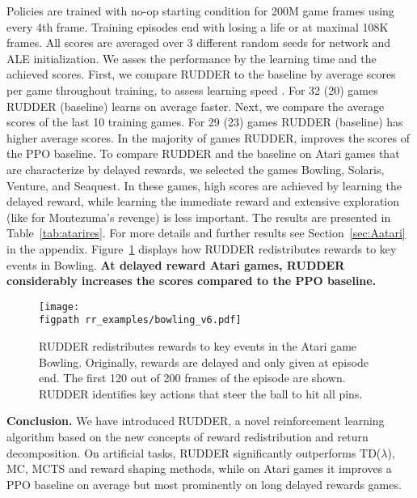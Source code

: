 \documentclass{article}
\newcommand{\figpath}{figures/}
\begin{document}
Policies are trained with no-op starting condition
for 200M game frames using every 4th frame.
Training episodes end with losing a life 
or at maximal 108K frames.
All scores are averaged over 3 different random seeds 
for network and ALE initialization.
We asses the performance by the learning time and
the achieved scores. 
First, we compare RUDDER to the baseline by
average scores per game throughout training, 
to assess learning speed \cite{Schulman:17}.
For 32 (20) games RUDDER (baseline) learns on average faster.
Next, we compare the average scores of the last 10 training games.
For 29 (23) games RUDDER (baseline) has higher average scores.
In the majority of games RUDDER, improves the scores of the PPO baseline.
To compare RUDDER and the baseline on Atari games that are 
characterize by delayed rewards, 
we selected the games Bowling, Solaris, Venture, and Seaquest.
In these games, high scores are achieved by learning the delayed reward, 
while learning the immediate reward and 
extensive exploration (like for Montezuma's revenge)
is less important.
The results are presented in Table~\ref{tab:atarires}.
For more details and further results see Section~\ref{sec:Aatari} in the appendix.
Figure~\ref{fig:bowlingExample}
displays how RUDDER redistributes rewards to key events 
in Bowling.
{\bf At delayed reward Atari games,
RUDDER considerably increases the scores compared to the PPO baseline.}

\begin{figure}[htp]
\begin{center}
\texttt{[image: \\figpath rr\_examples/bowling\_v6.pdf]} 
\caption{RUDDER redistributes rewards to key events in the Atari game Bowling.
Originally, rewards are delayed and only given at episode end.
The first 120 out of 200 frames of the episode are shown.
RUDDER identifies key actions that steer the ball to hit all pins.
\label{fig:bowlingExample}}
\end{center}
\end{figure}









{\bf Conclusion.} 
We have introduced RUDDER, a novel reinforcement learning 
algorithm based on the new concepts of reward redistribution
and return decomposition.
On artificial tasks,
RUDDER significantly outperforms TD($\lambda$), MC, MCTS and reward shaping methods,
while on Atari games it improves a PPO baseline on average but 
most prominently on long delayed rewards games.
\end{document}
